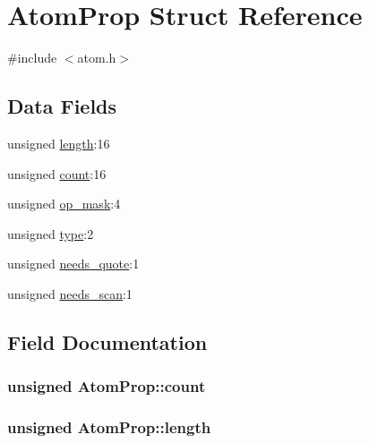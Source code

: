 \hypertarget{structAtomProp}{}\section{Atom\+Prop Struct Reference}
\label{structAtomProp}


{\ttfamily \#include $<$atom.\+h$>$}

\subsection*{Data Fields}
\begin{DoxyCompactItemize}
\item 
unsigned \hyperlink{structAtomProp_a5708a8e58126cdcd641e6c24e7dd429d}{length}\+:16
\item 
unsigned \hyperlink{structAtomProp_a686f0165443645d420bfd7381ddfedb0}{count}\+:16
\item 
unsigned \hyperlink{structAtomProp_add308662f264e390f71e5557b97837c0}{op\+\_\+mask}\+:4
\item 
unsigned \hyperlink{structAtomProp_accd017afa6f2854bb9316f492449c025}{type}\+:2
\item 
unsigned \hyperlink{structAtomProp_a4b3fe8dfeb73dc67be63684028709774}{needs\+\_\+quote}\+:1
\item 
unsigned \hyperlink{structAtomProp_ada3d42fc8a9d6e708de7db347444b6ee}{needs\+\_\+scan}\+:1
\end{DoxyCompactItemize}


\subsection{Field Documentation}
\subsubsection[{\texorpdfstring{count}{count}}]{\setlength{\rightskip}{0pt plus 5cm}unsigned Atom\+Prop\+::count}\hypertarget{structAtomProp_a686f0165443645d420bfd7381ddfedb0}{}\label{structAtomProp_a686f0165443645d420bfd7381ddfedb0}
\subsubsection[{\texorpdfstring{length}{length}}]{\setlength{\rightskip}{0pt plus 5cm}unsigned Atom\+Prop\+::length}\hypertarget{structAtomProp_a5708a8e58126cdcd641e6c24e7dd429d}{}\label{structAtomProp_a5708a8e58126cdcd641e6c24e7dd429d}
